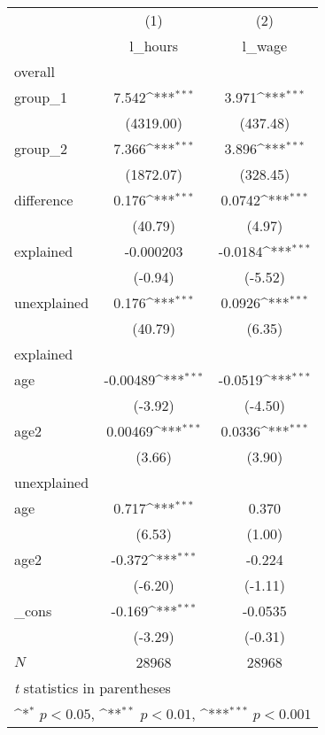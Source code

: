 \begin{table}
    \begin{center}
        
    
\def\sym#1{\ifmmode^{#1}\else\(^{#1}\)\fi}
\begin{tabular}{l*{2}{c}}
\hline\hline
            &\multicolumn{1}{c}{(1)}&\multicolumn{1}{c}{(2)}\\
            &\multicolumn{1}{c}{l\_hours}&\multicolumn{1}{c}{l\_wage}\\
\hline
overall     &                     &                     \\
group\_1     &       7.542\sym{***}&       3.971\sym{***}\\
            &   (4319.00)         &    (437.48)         \\
[1em]
group\_2     &       7.366\sym{***}&       3.896\sym{***}\\
            &   (1872.07)         &    (328.45)         \\
[1em]
difference  &       0.176\sym{***}&      0.0742\sym{***}\\
            &     (40.79)         &      (4.97)         \\
[1em]
explained   &   -0.000203         &     -0.0184\sym{***}\\
            &     (-0.94)         &     (-5.52)         \\
[1em]
unexplained &       0.176\sym{***}&      0.0926\sym{***}\\
            &     (40.79)         &      (6.35)         \\
\hline
explained   &                     &                     \\
age         &    -0.00489\sym{***}&     -0.0519\sym{***}\\
            &     (-3.92)         &     (-4.50)         \\
[1em]
age2        &     0.00469\sym{***}&      0.0336\sym{***}\\
            &      (3.66)         &      (3.90)         \\
\hline
unexplained &                     &                     \\
age         &       0.717\sym{***}&       0.370         \\
            &      (6.53)         &      (1.00)         \\
[1em]
age2        &      -0.372\sym{***}&      -0.224         \\
            &     (-6.20)         &     (-1.11)         \\
[1em]
\_cons      &      -0.169\sym{***}&     -0.0535         \\
            &     (-3.29)         &     (-0.31)         \\
\hline
\(N\)       &       28968         &       28968         \\
\hline\hline
\multicolumn{3}{l}{\footnotesize \textit{t} statistics in parentheses}\\
\multicolumn{3}{l}{\footnotesize \sym{*} \(p<0.05\), \sym{**} \(p<0.01\), \sym{***} \(p<0.001\)}\\
\end{tabular}
\end{center}
\end{table}
